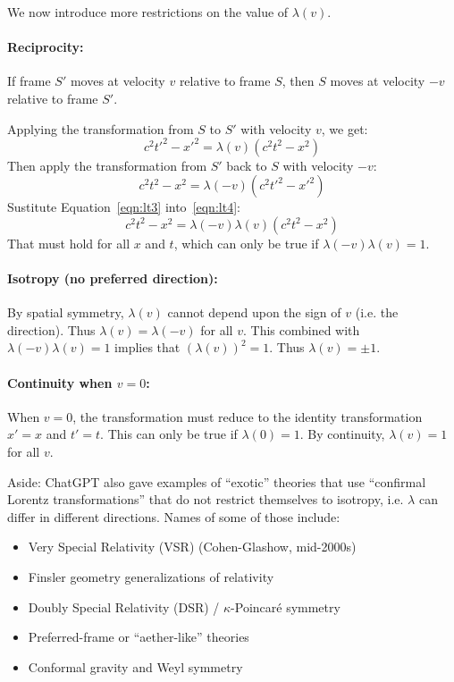 \documentclass[a4paper]{article}
\theoremstyle{plain}
\theoremstyle{definition}
\begin{document}
We now introduce more restrictions on the value of $\lambda(v)$.

\paragraph{Reciprocity:}

If frame $S'$ moves at velocity $v$ relative to frame $S$,
then $S$ moves at velocity $-v$ relative to frame $S'$.

Applying the transformation from $S$ to $S'$ with velocity $v$, we get:
\begin{equation}
c^2 t'^2 - x'^2 = \lambda(v) (c^2 t^2 - x^2) \label{eqn:lt3}
\end{equation}
Then apply the transformation from $S'$ back to $S$ with velocity $-v$:
\begin{equation}
c^2 t^2 - x^2 = \lambda(-v) (c^2 t'^2 - x'^2) \label{eqn:lt4}
\end{equation}
Sustitute Equation~\eqref{eqn:lt3} into~\eqref{eqn:lt4}:
\begin{equation}
c^2 t^2 - x^2 = \lambda(-v) \lambda(v) (c^2 t^2 - x^2) \nonumber
\end{equation}
That must hold for all $x$ and $t$, which can only be true if
$\lambda(-v) \lambda(v) = 1$.

\paragraph{Isotropy (no preferred direction):}

By spatial symmetry, $\lambda(v)$ cannot depend upon the sign of $v$
(i.e. the direction).  Thus $\lambda(v) = \lambda(-v)$ for all $v$.
This combined with
$\lambda(-v) \lambda(v) = 1$ implies that $(\lambda(v))^2 = 1$.
Thus $\lambda(v) = \pm 1$.

\paragraph{Continuity when $v=0$:}

When $v=0$, the transformation must reduce to the identity
transformation $x'=x$ and $t'=t$.
This can only be true if $\lambda(0)=1$.
By continuity, $\lambda(v)=1$ for all $v$.

Aside: ChatGPT also gave examples of ``exotic'' theories that use
``confirmal Lorentz transformations'' that do not restrict themselves
to isotropy, i.e. $\lambda$ can differ in different directions.  Names
of some of those include:
\begin{itemize}
\item Very Special Relativity (VSR) (Cohen-Glashow, mid-2000s)
\item Finsler geometry generalizations of relativity
\item Doubly Special Relativity (DSR) / $\kappa$-Poincar\'{e} symmetry
\item Preferred-frame or ``aether-like'' theories
\item Conformal gravity and Weyl symmetry
\end{itemize}
\end{document}
